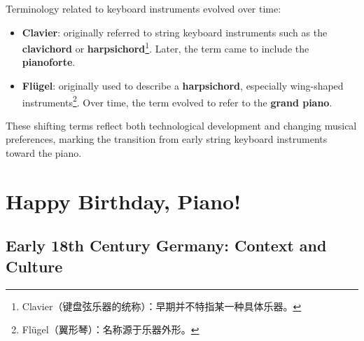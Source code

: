 \documentclass[math,code]{amznotes}
\theoremstyle{remark}
\begin{document}
Terminology related to keyboard instruments evolved over time:

\begin{itemize}
    \item \textbf{Clavier}: originally referred to string keyboard instruments such as the \textbf{clavichord} or \textbf{harpsichord}\footnote{Clavier（键盘弦乐器的统称）：早期并不特指某一种具体乐器。}.  
    Later, the term came to include the \textbf{pianoforte}.
    
    \item \textbf{Fl\"ugel}: originally used to describe a \textbf{harpsichord}, especially wing-shaped instruments\footnote{Fl\"ugel（翼形琴）：名称源于乐器外形。}.  
    Over time, the term evolved to refer to the \textbf{grand piano}.
\end{itemize}

These shifting terms reflect both technological development and changing musical preferences, marking the transition from early string keyboard instruments toward the piano.

\section{Happy Birthday, Piano!}

\subsection{Early 18th Century Germany: Context and Culture}
\end{document}
